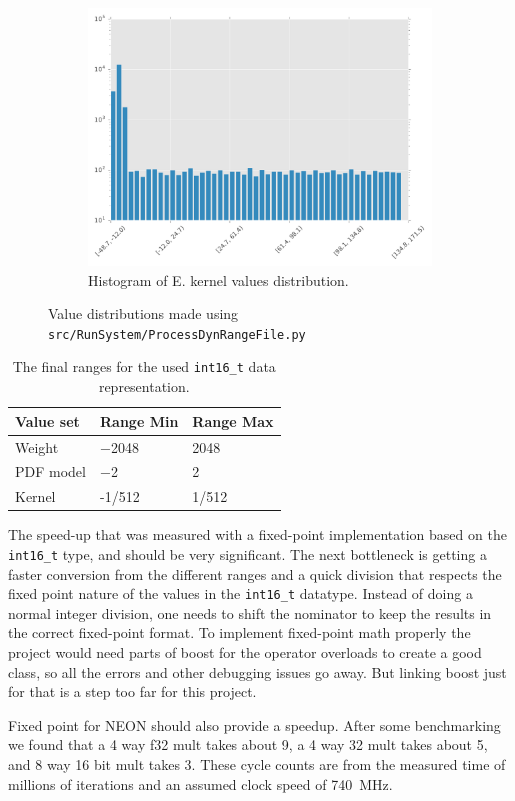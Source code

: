 \documentclass[final]{article}
\begin{document}
\begin{figure}[H]
\begin{subfigure}[b]{0.32\textwidth}
        \includegraphics[width=\textwidth]{resources/histogramE}
        \caption{Histogram of E. kernel values distribution.}
    \end{subfigure}
    \caption{Value distributions made using \texttt{src/RunSystem/ProcessDynRangeFile.py}}
    \label{fig:value-distributions}
\end{figure}

\begin{table}[H]
    \centering
    \caption{The final ranges for the used \texttt{int16\_t} data representation.}
    \label{tab:final-ranges}
    \begin{tabular}{lll}
        \toprule
        \textbf{Value set} & \textbf{Range Min} & \textbf{Range Max} \\
        \midrule
        Weight      &  \num{-2048}  &  \num{2048}     \\
        PDF model   &  \num{-2}   &  \num{2}      \\
        Kernel      &  \num{-1/512} &  \num{1/512}    \\
        \bottomrule
    \end{tabular}
\end{table}

The speed-up that was measured with a fixed-point implementation based on the \texttt{int16\_t} type, and should be very significant.
The next bottleneck is getting a faster conversion from the different ranges and a quick division that respects the fixed point nature of the values in the \texttt{int16\_t} datatype.
Instead of doing a normal integer division, one needs to shift the nominator to keep the results in the correct fixed-point format.
To implement fixed-point math properly the project would need parts of boost for the operator overloads to create a good class, so all the errors and other debugging issues go away.
But linking boost just for that is a step too far for this project.

Fixed point for NEON should also provide a speedup.
After some benchmarking we found that a 4 way f32 mult takes about \SI{9}{\cycles}, a 4 way 32 mult takes about \SI{5}{\cycles}, and 8 way 16 bit mult takes \SI{3}{\cycles}.
These cycle counts are from the measured time of millions of iterations and an assumed clock speed of \SI{740}{\mega\hertz}.
\end{document}
